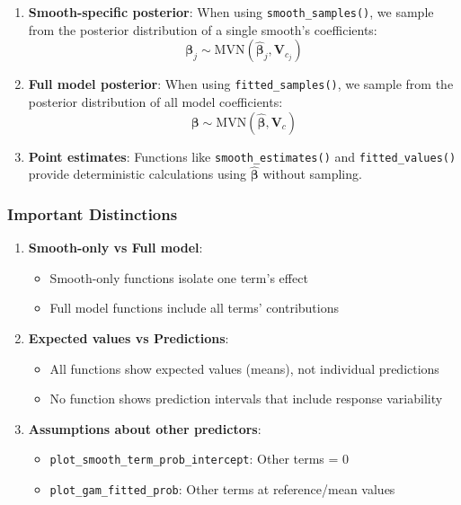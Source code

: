 \documentclass[11pt, a4paper]{article}
\begin{document}
\begin{enumerate}
\item \textbf{Smooth-specific posterior}: When using \texttt{smooth\_samples()}, we sample from the posterior distribution of a single smooth's coefficients:
$$\boldsymbol{\beta}_j \sim \text{MVN}(\hat{\boldsymbol{\beta}}_j, \mathbf{V}_{c_j})$$

\item \textbf{Full model posterior}: When using \texttt{fitted\_samples()}, we sample from the posterior distribution of all model coefficients:
$$\boldsymbol{\beta} \sim \text{MVN}(\hat{\boldsymbol{\beta}}, \mathbf{V}_c)$$

\item \textbf{Point estimates}: Functions like \texttt{smooth\_estimates()} and \texttt{fitted\_values()} provide deterministic calculations using $\hat{\boldsymbol{\beta}}$ without sampling.
\end{enumerate}

\subsubsection{Important Distinctions}

\begin{enumerate}
\item \textbf{Smooth-only vs Full model}: 
   \begin{itemize}
   \item Smooth-only functions isolate one term's effect
   \item Full model functions include all terms' contributions
   \end{itemize}

\item \textbf{Expected values vs Predictions}:
   \begin{itemize}
   \item All functions show expected values (means), not individual predictions
   \item No function shows prediction intervals that include response variability
   \end{itemize}

\item \textbf{Assumptions about other predictors}:
   \begin{itemize}
   \item \texttt{plot\_smooth\_term\_prob\_intercept}: Other terms = 0
   \item \texttt{plot\_gam\_fitted\_prob}: Other terms at reference/mean values
   \end{itemize}
\end{enumerate}
\end{document}
